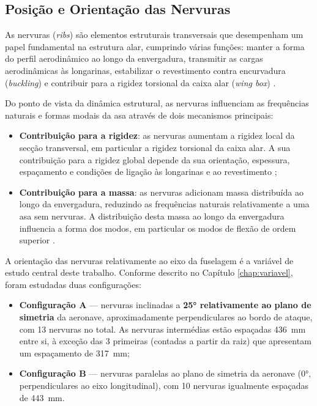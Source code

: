 \documentclass[11pt,twoside,a4paper]{report}
\begin{document}
\subsection{Posição e Orientação das Nervuras}

As nervuras (\textit{ribs}) são elementos estruturais transversais que desempenham um papel fundamental na estrutura alar, cumprindo várias funções: manter a forma do perfil aerodinâmico ao longo da envergadura, transmitir as cargas aerodinâmicas às longarinas, estabilizar o revestimento contra encurvadura (\textit{buckling}) e contribuir para a rigidez torsional da caixa alar (\textit{wing box}) \cite{Megson2012, Niu1988}.

Do ponto de vista da dinâmica estrutural, as nervuras influenciam as frequências naturais e formas modais da asa através de dois mecanismos principais:

\begin{itemize}
    \item \textbf{Contribuição para a rigidez}: as nervuras aumentam a rigidez local da secção transversal, em particular a rigidez torsional da caixa alar. A sua contribuição para a rigidez global depende da sua orientação, espessura, espaçamento e condições de ligação às longarinas e ao revestimento \cite{Niu1988};

    \item \textbf{Contribuição para a massa}: as nervuras adicionam massa distribuída ao longo da envergadura, reduzindo as frequências naturais relativamente a uma asa sem nervuras. A distribuição desta massa ao longo da envergadura influencia a forma dos modos, em particular os modos de flexão de ordem superior \cite{Craig2006}.
\end{itemize}

A orientação das nervuras relativamente ao eixo da fuselagem é a 
variável de estudo central deste trabalho. Conforme descrito no 
Capítulo \ref{chap:variavel}, foram estudadas duas configurações:

\begin{itemize}
    \item \textbf{Configuração A} --- nervuras inclinadas a \textbf{25° relativamente ao plano de simetria} da aeronave, aproximadamente perpendiculares ao bordo de ataque, com 13 nervuras no total. As nervuras intermédias estão espaçadas \SI{436}{\milli\meter} entre si, à exceção das 3 primeiras (contadas a partir da raiz) que apresentam um espaçamento de \SI{317}{\milli\meter};

    \item \textbf{Configuração B} --- nervuras paralelas ao plano de simetria da aeronave (0°, perpendiculares ao eixo longitudinal), com 10 nervuras igualmente espaçadas de \SI{443}{\milli\meter}.
\end{itemize}
\end{document}
